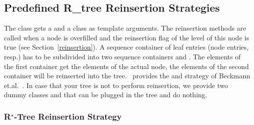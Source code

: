 \subsection{Predefined R\_tree Reinsertion Strategies}
\label{Reinsertpre}
\label{Reinsertionpre}

The  class gets a  and a
  class as template
arguments. 
The reinsertion methods are called when a node is
overfilled and the reinsertion flag of the level of this node 
 is true (see Section~\ref{reinsertion}).
A sequence container of leaf  entries (node
entries, resp.) has to be subdivided into two sequence containers 
 and . The elements of the
first container get the elements of the actual node, the elements 
of the second container will be reinserted into the tree.
\cgal\  provides the 
 and   
strategy of Beckmann
et.al.~\cite{bkss-rtera-90}. 
In case that your tree is not to perform reinsertion, we provide
two dummy classes  and
 that can be plugged in the tree and do nothing.

\subsubsection{R$^\star$-Tree Reinsertion Strategy}

